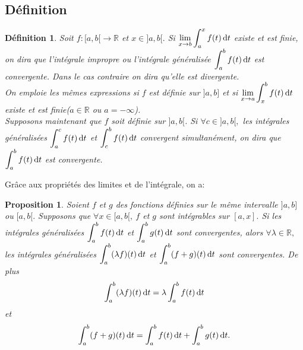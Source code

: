 \documentclass[11pt, a4paper]{book}
\newtheorem{defi}{D\'efinition}[section]
\newtheorem{pro}{Proposition}[section]
\begin{document}
\subsection{D\'efinition}
\begin{defi} Soit $f:[a,b[\longrightarrow \mathbb{R}$ et $x\in ]a,b[.$ Si ${\displaystyle \lim_{x\rightarrow b}\int_a^x f(t)\,\mathrm{d} t}$ existe et est finie, on dira que l'int\'egrale impropre ou l'int\'egrale g\'en\'eralis\'ee ${\displaystyle \int_a^b f(t)\,\mathrm{d} t}$ est convergente. Dans le cas contraire on dira qu'elle est divergente. \\
On emploie les m\^emes expressions si $f$ est d\'efinie sur $]a,b]$ et si ${\displaystyle\lim_{x\rightarrow a}\int_x^b f(t)\,\mathrm{d} t}$ existe et est finie\quad ($a\in \mathbb{R}$ ou $a=-\infty$).\\
Supposons maintenant que $f$ soit d\'efinie sur $]a,b[$. Si $\forall c\in ]a,b[,$ les int\'egrales g\'en\'eralis\'ees ${\displaystyle \int_a^c f(t)\,\mathrm{d} t}$ et ${\displaystyle \int_c^b f(t)\,\mathrm{d} t}$ convergent simultan\'ement, on dira que ${\displaystyle \int_a^b f(t)\,\mathrm{d} t}$ est convergente.\end{defi}
Gr\^ace aux propri\'et\'es des limites et de l'int\'egrale, on a:
\begin{pro} \label{pro3.1.1} Soient $f$ et $g$ des fonctions d\'efinies sur le m\^eme intervalle $]a,b]$ ou $[a,b[.$ 
Supposons que $\forall x\in [a,b[, ~f$ et $g$ sont int\'egrables sur $[a,x].$ 
Si les int\'egrales g\'en\'eralis\'ees ${\displaystyle \int_a^b f(t)\,\mathrm{d} t}$ et ${\displaystyle \int_a^b g(t)\,\mathrm{d} t}$ sont convergentes, alors $\forall \lambda \in \mathbb{R}, $ les int\'egrales g\'en\'eralis\'ees ${\displaystyle \int_a^b(\lambda f)(t)\,\mathrm{d} t}$ et ${\displaystyle \int_a^b (f+g)(t)\,\mathrm{d} t}$ sont convergentes.
De plus $$ \int_a^b (\lambda f)(t)\,\mathrm{d} t=\lambda \int_a^b f(t)\,\mathrm{d} t$$ et $$ \int_a^b(f+g)(t)\,\mathrm{d} t=\int_a^b f(t)\,\mathrm{d} t+\int_a^b g(t)\,\mathrm{d} t.$$ \end{pro}
\end{document}

